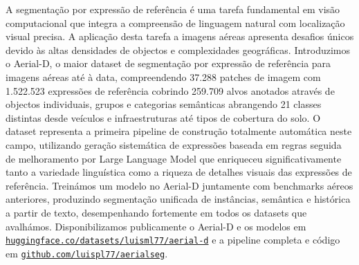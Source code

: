 \acresetall
\noindent A segmentação por expressão de referência é uma tarefa fundamental em visão computacional que integra a compreensão de linguagem natural com localização visual precisa. A aplicação desta tarefa a imagens aéreas apresenta desafios únicos devido às altas densidades de objectos e complexidades geográficas. Introduzimos o Aerial-D, o maior dataset de segmentação por expressão de referência para imagens aéreas até à data, compreendendo 37.288 patches de imagem com 1.522.523 expressões de referência cobrindo 259.709 alvos anotados através de objectos individuais, grupos e categorias semânticas abrangendo 21 classes distintas desde veículos e infraestruturas até tipos de cobertura do solo. O dataset representa a primeira pipeline de construção totalmente automática neste campo, utilizando geração sistemática de expressões baseada em regras seguida de melhoramento por Large Language Model que enriqueceu significativamente tanto a variedade linguística como a riqueza de detalhes visuais das expressões de referência. Treinámos um modelo no Aerial-D juntamente com benchmarks aéreos anteriores, produzindo segmentação unificada de instâncias, semântica e histórica a partir de texto, desempenhando fortemente em todos os datasets que avalhámos. Disponibilizamos publicamente o Aerial-D e os modelos em \href{https://huggingface.co/datasets/luisml77/aerial-d}{\texttt{huggingface.co/datasets/luisml77/aerial-d}} e a pipeline completa e código em \href{https://github.com/luispl77/aerialseg}{\texttt{github.com/luispl77/aerialseg}}.